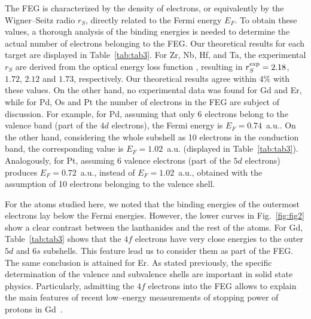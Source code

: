 The FEG is characterized by the density of electrons, or equivalently 
by the Wigner--Seitz radio $r_S$, directly related to the Fermi energy
$E_F$.
To obtain these values, a thorough analysis of the binding energies is
needed to determine the actual number of electrons belonging to the 
FEG. Our theoretical results for each target are displayed in 
Table~\ref{tab:tab3}.
For Zr, Nb, Hf, and Ta, the experimental $r_S$ are derived 
from the optical energy loss function \cite{werner,lynch,isaacson,romaniello},
resulting in $r_S^{\mbox{\scriptsize exp}}=2.18$, $1.72$, $2.12$ and $1.73$,
respectively. Our theoretical results agree within $4\%$ with these
values.
On the other hand, no experimental data was found for Gd and Er,
while for Pd, Os and Pt the number of electrons in the FEG are subject
of discussion. For example, for Pd, assuming that only 6 electrons belong
to the valence band (part of the $4d$ electrons), the Fermi energy is
$E_F=0.74$~a.u.. On the other hand, considering the whole subshell as
10 electrons in the conduction band, the corresponding
value is $E_F=1.02$~a.u. (displayed in Table~\ref{tab:tab3}).
Analogously, for Pt, assuming 6 valence
electrons (part of the $5d$ electrons) produces $E_F=0.72$~a.u., instead
of $E_F=1.02$~a.u., obtained with the assumption of 10 electrons 
belonging to the valence shell.


For the atoms studied here, we noted that the binding energies of the 
outermost electrons lay below the Fermi energies. However, the lower 
curves in Fig.~\ref{fig:fig2} show a clear contrast between the 
lanthanides and the rest of the atoms. 
For Gd, Table~\ref{tab:tab3} shows that the $4f$ electrons have very 
close energies to the outer $5d$ and $6s$ subshells. This feature lead 
us to consider them as part of the FEG. The same conclusion is attained
for Er.
As stated previously, the specific determination of the valence and 
subvalence shells are important in solid state physics. Particularly,
admitting the $4f$ electrons into the FEG allows to explain
\cite{Montanari:17,Montanari:19} the main features of recent low--energy
measurements of stopping power of protons in Gd~\cite{Ro17}.




